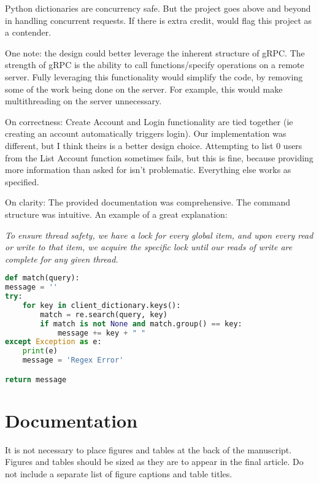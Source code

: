 \documentclass[9pt,twocolumn,twoside]{osajnl}
\begin{document}
Python dictionaries are concurrency safe. But the project goes above and beyond in handling concurrent requests. If there is extra credit, would flag this project as a contender. 

One note: the design could better leverage the inherent structure of gRPC. The strength of gRPC is the ability to call functions/specify operations on a remote server. Fully leveraging this functionality would simplify the code, by removing some of the work being done on the server. For example, this would make multithreading on the server unnecessary.

On correctness: Create Account and Login functionality are tied together (ie creating an account automatically triggers login). Our implementation was different, but I think theirs is a better design choice. Attempting to list 0 users from the List Account function sometimes fails, but this is fine, because providing more information than asked for isn't problematic. Everything else works as specified. 

On clarity: The provided documentation was comprehensive. The command structure was intuitive. An example of a great explanation:

\textit{To ensure thread safety, we have a lock for every global item, and upon every read or write to that item, we acquire the specific lock until our reads of write are complete for any given thread.} 


\begin{lstlisting}[language=python,caption={use code samples like this}]
def match(query):
message = ''
try:
    for key in client_dictionary.keys():
        match = re.search(query, key)
        if match is not None and match.group() == key:
            message += key + " "
except Exception as e:
    print(e)
    message = 'Regex Error'

return message
\end{lstlisting}

\section{Documentation}

It is not necessary to place figures and tables at the back of the manuscript. Figures and tables should be sized as they are to appear in the final article. Do not include a separate list of figure captions and table titles.


  
\end{document}
